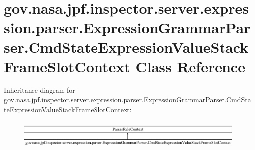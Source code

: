 \hypertarget{classgov_1_1nasa_1_1jpf_1_1inspector_1_1server_1_1expression_1_1parser_1_1_expression_grammar_pa53e28d24e840d016fb7c58b2b73008ab}{}\section{gov.\+nasa.\+jpf.\+inspector.\+server.\+expression.\+parser.\+Expression\+Grammar\+Parser.\+Cmd\+State\+Expression\+Value\+Stack\+Frame\+Slot\+Context Class Reference}
\label{classgov_1_1nasa_1_1jpf_1_1inspector_1_1server_1_1expression_1_1parser_1_1_expression_grammar_pa53e28d24e840d016fb7c58b2b73008ab}
Inheritance diagram for gov.\+nasa.\+jpf.\+inspector.\+server.\+expression.\+parser.\+Expression\+Grammar\+Parser.\+Cmd\+State\+Expression\+Value\+Stack\+Frame\+Slot\+Context\+:\begin{figure}[H]
\begin{center}
\leavevmode
\includegraphics[height=1.534247cm]{classgov_1_1nasa_1_1jpf_1_1inspector_1_1server_1_1expression_1_1parser_1_1_expression_grammar_pa53e28d24e840d016fb7c58b2b73008ab}
\end{center}
\end{figure}
